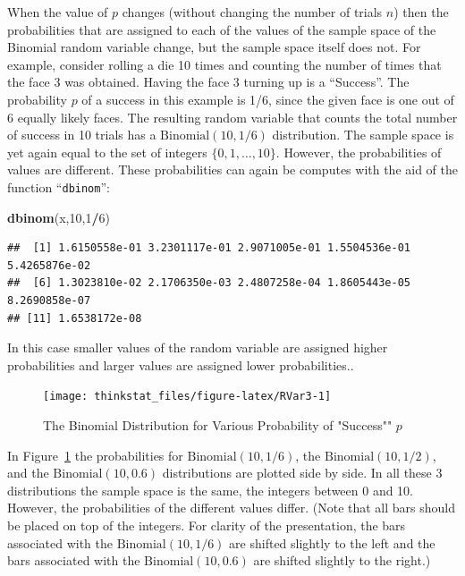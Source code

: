 \documentclass[]{krantz}
\makeatletter
\newenvironment{Shaded}{\begin{snugshade}}{\end{snugshade}}
\newcommand{\KeywordTok}[1]{\textcolor[rgb]{0.13,0.29,0.53}{\textbf{#1}}}
\newcommand{\DecValTok}[1]{\textcolor[rgb]{0.00,0.00,0.81}{#1}}
\newcommand{\OperatorTok}[1]{\textcolor[rgb]{0.81,0.36,0.00}{\textbf{#1}}}
\newcommand{\NormalTok}[1]{#1}
\newenvironment{kframe}{%
\medskip{}
\setlength{\fboxsep}{.8em}
 \def\at@end@of@kframe{}%
 \ifinner\ifhmode%
  \def\at@end@of@kframe{\end{minipage}}%
  \begin{minipage}{\columnwidth}%
 \fi\fi%
 \def\FrameCommand##1{\hskip\@totalleftmargin \hskip-\fboxsep
 \colorbox{shadecolor}{##1}\hskip-\fboxsep
     \hskip-\linewidth \hskip-\@totalleftmargin \hskip\columnwidth}%
 \MakeFramed {\advance\hsize-\width
   \@totalleftmargin\z@ \linewidth\hsize
   \@setminipage}}%
 {\par\unskip\endMakeFramed%
 \at@end@of@kframe}
\renewenvironment{Shaded}{\begin{kframe}}{\end{kframe}}
\theoremstyle{definition}
\theoremstyle{definition}
\theoremstyle{definition}
\theoremstyle{remark}
\makeatother
\begin{document}
When the value of \(p\) changes (without changing the number of trials
\(n\)) then the probabilities that are assigned to each of the values of
the sample space of the Binomial random variable change, but the sample
space itself does not. For example, consider rolling a die 10 times and
counting the number of times that the face 3 was obtained. Having the
face 3 turning up is a ``Success''. The probability \(p\) of a success
in this example is 1/6, since the given face is one out of 6 equally
likely faces. The resulting random variable that counts the total number
of success in 10 trials has a \(\mathrm{Binomial}(10,1/6)\)
distribution. The sample space is yet again equal to the set of integers
\(\{0,1, \ldots,10\}\). However, the probabilities of values are
different. These probabilities can again be computes with the aid of the
function ``\texttt{dbinom}'':

\begin{Shaded}
\begin{Highlighting}[]
\KeywordTok{dbinom}\NormalTok{(x,}\DecValTok{10}\NormalTok{,}\DecValTok{1}\OperatorTok{/}\DecValTok{6}\NormalTok{)}
\end{Highlighting}
\end{Shaded}

\begin{verbatim}
##  [1] 1.6150558e-01 3.2301117e-01 2.9071005e-01 1.5504536e-01 5.4265876e-02
##  [6] 1.3023810e-02 2.1706350e-03 2.4807258e-04 1.8605443e-05 8.2690858e-07
## [11] 1.6538172e-08
\end{verbatim}

In this case smaller values of the random variable are assigned higher
probabilities and larger values are assigned lower probabilities..

\begin{figure}

{\centering \texttt{[image: thinkstat\_files/figure-latex/RVar3-1]} 

}

\caption{The Binomial Distribution for Various Probability of "Success"" $p$}\label{fig:RVar3}
\end{figure}

In Figure~\ref{fig:RVar3} the probabilities for
\(\mathrm{Binomial}(10,1/6)\), the \(\mathrm{Binomial}(10,1/2)\), and
the \(\mathrm{Binomial}(10,0.6)\) distributions are plotted side by
side. In all these 3 distributions the sample space is the same, the
integers between 0 and 10. However, the probabilities of the different
values differ. (Note that all bars should be placed on top of the
integers. For clarity of the presentation, the bars associated with the
\(\mathrm{Binomial}(10,1/6)\) are shifted slightly to the left and the
bars associated with the \(\mathrm{Binomial}(10,0.6)\) are shifted
slightly to the right.)
\end{document}
